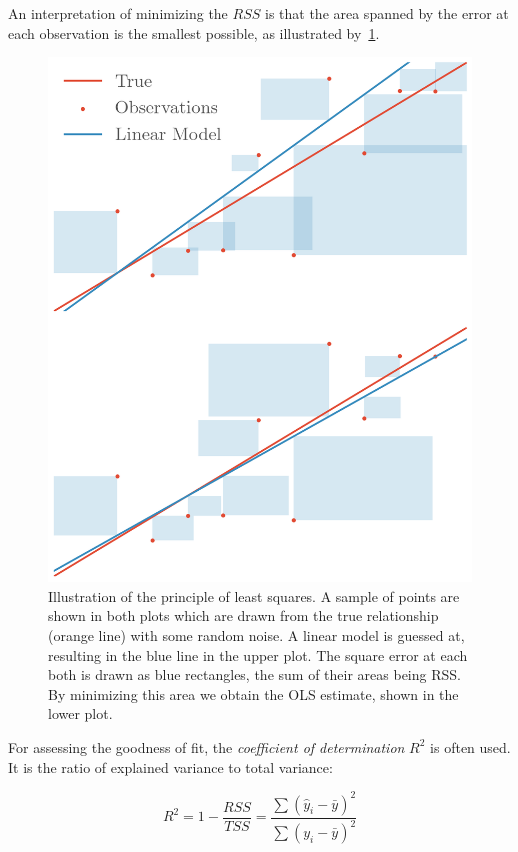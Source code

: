 An interpretation of minimizing the \(RSS\) is that the area spanned by the
error at each observation is the smallest possible, as illustrated by~\cref{fig:lq}.
\begin{figure}[]
  \centering
  \showthe\columnwidth
  \includegraphics[]{figures/leastsquares.png}
  \caption{\label{fig:lq} Illustration of the principle of least squares. A
    sample of points are shown in both plots which are drawn from the true
    relationship (orange line) with some random noise. A linear model is
    guessed at, resulting in the blue line in the upper plot. The square error at
    each both is drawn as blue rectangles, the sum of their areas being RSS. By
    minimizing this area we obtain the OLS estimate, shown in the lower plot.}
\end{figure}

For assessing the goodness of fit, the \textit{coefficient of determination}
\(R^{2}\) is often used. It is the ratio of explained variance to total variance:

\begin{equation*}
  R^{2} = 1 - \frac{RSS}{TSS} = \frac{\sum \left(\hat y_{i} - \bar{y} \right)^{2}}{\sum\left(y_{i} - \bar y \right)^{2}}
\end{equation*}

